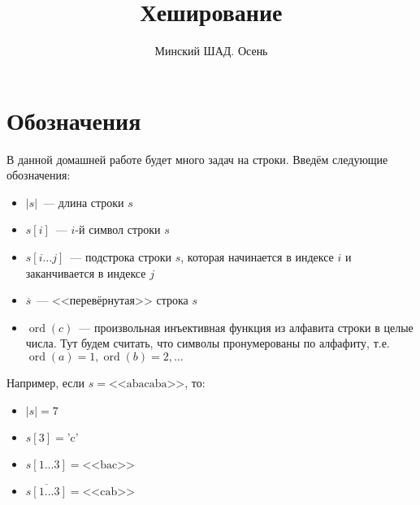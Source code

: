 \documentclass[addpoints]{exam}
\title{Хеширование}
\author{Минский ШАД. Осень}
\DeclareMathOperator{\ord}{ord}
\begin{document}
\printanswers
\maketitle

\section{Обозначения}

В данной домашней работе будет много задач на строки. Введём следующие обозначения:

\begin{itemize}
\item $|s|$~--- длина строки $s$
\item $s[i]$~--- $i$-й символ строки $s$
\item $s[i \ldots j]$~--- подстрока строки $s$, которая начинается в индексе $i$ и заканчивается в индексе $j$
\item $\overline{s}$~--- <<перевёрнутая>> строка $s$ 
\item $\ord(c)$~--- произвольная инъективная функция из алфавита строки в целые числа. Тут будем считать, что символы пронумерованы по алфафиту, т.е. $\ord(a) = 1, \ord(b) = 2, \ldots$ 
\end{itemize}

Например, если $s = \mbox{<<abacaba>>}$, то:

\begin{itemize}
\item $|s| = 7$ 
\item $s[3] = \mbox{'c'}$
\item $s[1\ldots3] = \mbox{<<bac>>}$
\item $\overline{s[1 \ldots 3]} = \mbox{<<cab>>}$  
\end{itemize}
\end{document}
